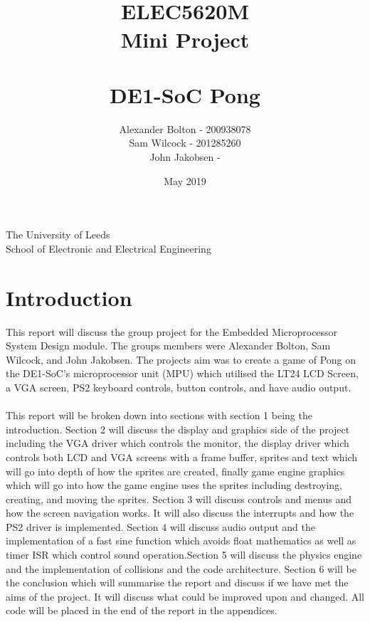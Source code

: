 \documentclass[a4paper,12pt]{article}
\begin{document}
\title{\\ \textbf{ELEC5620M \\ Mini Project \\ \- \\ DE1-SoC Pong }}
\author{Alexander Bolton - 200938078 \\ Sam Wilcock - 201285260\\ John Jakobsen - }
\date{May 2019}
\maketitle
\thispagestyle{empty}
\begin{center}

\end{center}
\vfill
\begin{center}
The University of Leeds \\  School of Electronic and Electrical Engineering
\end{center}

\newpage

\tableofcontents
\thispagestyle{empty}

\newpage 
{}
\section{Introduction}
\begin{flushleft}
This report will discuss the group project for the Embedded Microprocessor System Design module. The groups members were Alexander Bolton, Sam Wilcock, and John Jakobsen. The projects aim was to create a game of Pong on the DE1-SoC's microprocessor unit (MPU) which utilised the LT24 LCD Screen, a VGA screen, PS2 keyboard controls, button controls, and have audio output.
\\ \- \\
This report will be broken down into sections with section 1 being the introduction. Section 2 will discuss the display and graphics side of the project including the VGA driver which controls the monitor, the display driver which controls both LCD and VGA screens with a frame buffer, sprites and text which will go into depth of how the sprites are created, finally game engine graphics which will go into how the game engine uses the sprites including destroying, creating, and moving the sprites. Section 3 will discuss controls and menus and how the screen navigation works. It will also discuss the interrupts and how the PS2 driver is implemented. Section 4 will discuss audio output and the implementation of a fast sine function which avoids float mathematics as well as timer ISR which control sound operation.Section 5 will discuss the physics engine and the implementation of collisions and the code architecture. Section 6 will be the conclusion which will summarise the report and discuss if we have met the aims of the project. It will discuss what could be improved upon and changed. All code will be placed in the end of the report in the appendices. 
\end{flushleft}
\newpage
\end{document}
